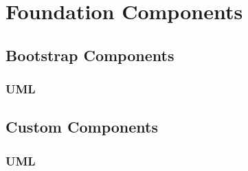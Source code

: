 \section{Foundation Components}

	\subsection{Bootstrap Components}
	
		\subsubsection{UML}
	
	\subsection{Custom Components}

		\subsubsection{UML}